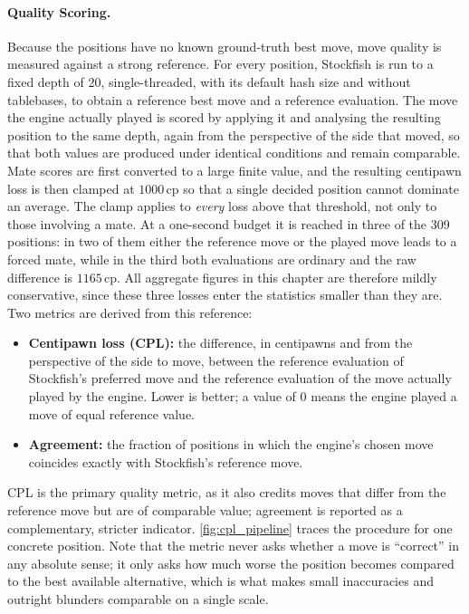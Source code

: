\paragraph{Quality Scoring.}
Because the positions have no known ground-truth best move, move quality is
measured against a strong reference. For every position, Stockfish is run to a
fixed depth of 20, single-threaded, with its default hash size and without
tablebases, to obtain a reference best move and a reference evaluation. The move
the engine actually played is scored by applying it and analysing the resulting
position to the same depth, again from the perspective of the side that moved, so
that both values are produced under identical conditions and remain comparable.
Mate scores are first converted to a large finite value, and the resulting
centipawn loss is then clamped at $1000$\,cp so that a single decided position
cannot dominate an average. The clamp applies to \emph{every} loss above that
threshold, not only to those involving a mate. At a one-second budget it is
reached in three of the 309 positions: in two of them either the reference move
or the played move leads to a forced mate, while in the third both evaluations
are ordinary and the raw difference is $1165$\,cp. All aggregate figures in this
chapter are therefore mildly conservative, since these three losses enter the
statistics smaller than they are. Two metrics are derived from this reference:
\begin{itemize}
    \item \textbf{Centipawn loss (CPL):} the difference, in centipawns and from
    the perspective of the side to move, between the reference evaluation of
    Stockfish's preferred move and the reference evaluation of the move actually
    played by the engine. Lower is better; a value of $0$ means the engine played
    a move of equal reference value.
    \item \textbf{Agreement:} the fraction of positions in which the engine's
    chosen move coincides exactly with Stockfish's reference move.
\end{itemize}
CPL is the primary quality metric, as it also credits moves that differ from the
reference move but are of comparable value; agreement is reported as a
complementary, stricter indicator. \cref{fig:cpl_pipeline} traces the procedure
for one concrete position. Note that the metric never asks whether a move is
``correct'' in any absolute sense; it only asks how much worse the position
becomes compared to the best available alternative, which is what makes small
inaccuracies and outright blunders comparable on a single scale.

